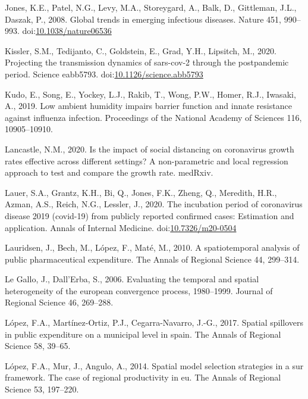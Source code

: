 \documentclass[]{elsarticle} %
\begin{document}
\leavevmode\hypertarget{ref-Jones2008global}{}%
Jones, K.E., Patel, N.G., Levy, M.A., Storeygard, A., Balk, D.,
Gittleman, J.L., Daszak, P., 2008. Global trends in emerging infectious
diseases. Nature 451, 990--993.
doi:\href{https://doi.org/10.1038/nature06536}{10.1038/nature06536}

\leavevmode\hypertarget{ref-Kissler2020projecting}{}%
Kissler, S.M., Tedijanto, C., Goldstein, E., Grad, Y.H., Lipsitch, M.,
2020. Projecting the transmission dynamics of sars-cov-2 through the
postpandemic period. Science eabb5793.
doi:\href{https://doi.org/10.1126/science.abb5793}{10.1126/science.abb5793}

\leavevmode\hypertarget{ref-Kudo2019low}{}%
Kudo, E., Song, E., Yockey, L.J., Rakib, T., Wong, P.W., Homer, R.J.,
Iwasaki, A., 2019. Low ambient humidity impairs barrier function and
innate resistance against influenza infection. Proceedings of the
National Academy of Sciences 116, 10905--10910.

\leavevmode\hypertarget{ref-Lancastle2020impact}{}%
Lancastle, N.M., 2020. Is the impact of social distancing on coronavirus
growth rates effective across different settings? A non-parametric and
local regression approach to test and compare the growth rate. medRxiv.

\leavevmode\hypertarget{ref-Lauer2020incubation}{}%
Lauer, S.A., Grantz, K.H., Bi, Q., Jones, F.K., Zheng, Q., Meredith,
H.R., Azman, A.S., Reich, N.G., Lessler, J., 2020. The incubation period
of coronavirus disease 2019 (covid-19) from publicly reported confirmed
cases: Estimation and application. Annals of Internal Medicine.
doi:\href{https://doi.org/10.7326/m20-0504}{10.7326/m20-0504}

\leavevmode\hypertarget{ref-Lauridsen2010spatiotemporal}{}%
Lauridsen, J., Bech, M., López, F., Maté, M., 2010. A spatiotemporal
analysis of public pharmaceutical expenditure. The Annals of Regional
Science 44, 299--314.

\leavevmode\hypertarget{ref-Legallo2006evaluating}{}%
Le Gallo, J., Dall'Erba, S., 2006. Evaluating the temporal and spatial
heterogeneity of the european convergence process, 1980--1999. Journal
of Regional Science 46, 269--288.

\leavevmode\hypertarget{ref-Lopez2017spatial}{}%
López, F.A., Martínez-Ortiz, P.J., Cegarra-Navarro, J.-G., 2017. Spatial
spillovers in public expenditure on a municipal level in spain. The
Annals of Regional Science 58, 39--65.

\leavevmode\hypertarget{ref-Lopez2014spatial}{}%
López, F.A., Mur, J., Angulo, A., 2014. Spatial model selection
strategies in a sur framework. The case of regional productivity in eu.
The Annals of Regional Science 53, 197--220.
\end{document}
